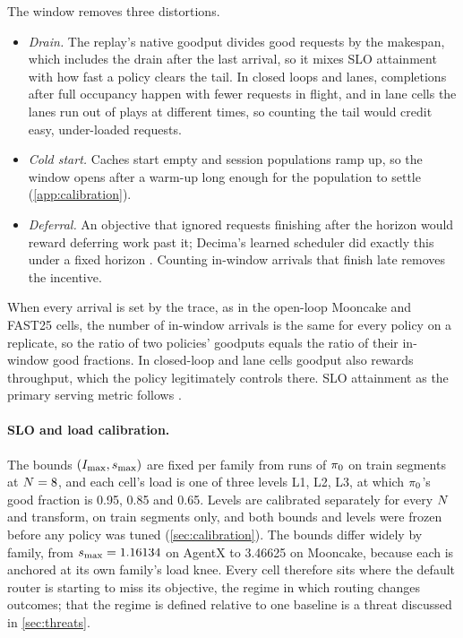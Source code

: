 The window removes three distortions.
\begin{itemize}
  \item \emph{Drain.} The replay's native goodput divides good requests by the makespan, which
    includes the drain after the last arrival, so it mixes SLO attainment with how fast a policy
    clears the tail.
    In closed loops and lanes, completions after full occupancy happen with fewer requests in
    flight, and in lane cells the lanes run out of plays at different times, so counting the tail
    would credit easy, under-loaded requests.
  \item \emph{Cold start.} Caches start empty and session populations ramp up, so the window opens
    after a warm-up long enough for the population to settle (\cref{app:calibration}).
  \item \emph{Deferral.} An objective that ignored requests finishing after the horizon would
    reward deferring work past it; Decima's learned scheduler did exactly this under a fixed
    horizon \citep{mao2019decima}. Counting in-window arrivals that finish late removes the
    incentive.
\end{itemize}
When every arrival is set by the trace, as in the open-loop Mooncake and FAST25 cells, the number
of in-window arrivals is the same for every policy on a replicate, so the ratio of two policies'
goodputs equals the ratio of their in-window good fractions. In closed-loop and lane cells
goodput also rewards throughput, which the policy legitimately controls there. SLO attainment as
the primary serving metric follows \citet{zhong2024distserve}.

\paragraph{SLO and load calibration.}
The bounds $(I_{\max},s_{\max})$ are fixed per family from runs of $\pi_{0}$ on train segments at
$N = 8$, and each cell's load is one of three levels L1, L2, L3, at which $\pi_{0}$'s good fraction
is 0.95, 0.85 and 0.65. Levels are calibrated separately for every $N$ and transform, on train
segments only, and both bounds and levels were frozen before any policy was tuned
(\cref{sec:calibration}). The bounds differ widely by family, from $s_{\max} = 1.16134$ on AgentX to
3.46625 on Mooncake, because each is anchored at its own family's load knee. Every cell therefore
sits where the default router is starting to miss its objective, the regime in which routing
changes outcomes; that the regime is defined relative to one baseline is a threat discussed in
\cref{sec:threats}.

